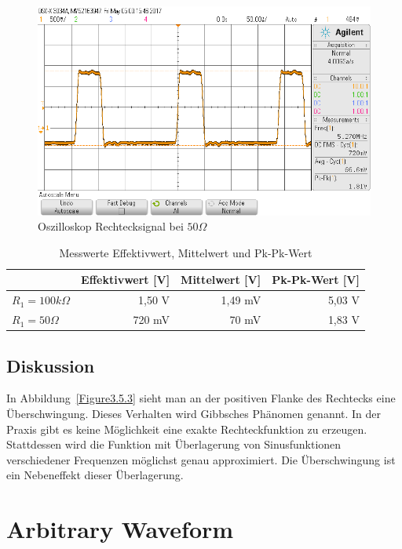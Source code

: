 \documentclass[12pt,a4paper,titlepage]{article}
\begin{document}
\begin{figure}[H]
  \centering
  \includegraphics[width=14cm]{oszi_square_50.png}
  \caption{Oszilloskop Rechtecksignal bei $50 \Omega$}
  \label{Figure3.5.5}
\end{figure}

\begin{table}[H]
\centering
\begin{tabular}[t]{|l|r|r|r|}
\hline
           & Effektivwert {[}V{]} & Mittelwert {[}V{]} & Pk-Pk-Wert {[}V{]} \\ \hline
$R_1=100 k\Omega$ & 1,50 V               & 1,49 mV            & 5,03 V             \\ \hline
$R_1=50 \Omega$    & 720 mV               & 70 mV              & 1,83 V             \\ \hline
\end{tabular}
\caption{Messwerte Effektivwert, Mittelwert und Pk-Pk-Wert}
\label{Figure3.5.4}
\end{table}

\subsection{Diskussion}
In Abbildung~\ref{Figure3.5.3} sieht man an der positiven Flanke des Rechtecks eine \"Uberschwingung. Dieses Verhalten wird Gibbsches Ph\"anomen genannt. In der Praxis gibt es keine M\"oglichkeit eine exakte Rechteckfunktion zu erzeugen. Stattdessen wird die Funktion mit \"Uberlagerung von Sinusfunktionen verschiedener Frequenzen m\"oglichst genau approximiert. Die \"Uberschwingung ist ein Nebeneffekt dieser \"Uberlagerung. \\



\newpage
\section{Arbitrary Waveform}
\end{document}

